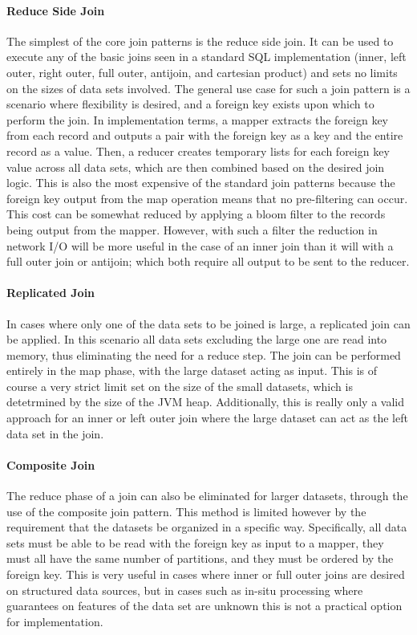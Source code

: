 \paragraph{Reduce Side Join}
The simplest of the core join patterns is the reduce side join. It can be used to execute any of the basic joins seen in a standard SQL implementation (inner, left outer, right outer, full outer, antijoin, and cartesian product) and sets no limits on the sizes of data sets involved. The general use case for such a join pattern is a scenario where flexibility is desired, and a foreign key exists upon which to perform the join. In implementation terms, a mapper extracts the foreign key from each record and outputs a pair with the foreign key as a key and the entire record as a value. Then, a reducer creates temporary lists for each foreign key value across all data sets, which are then combined based on the desired join logic. This is also the most expensive of the standard join patterns because the foreign key output from the map operation means that no pre-filtering can occur. This cost can be somewhat reduced by applying a bloom filter to the records being output from the mapper. However, with such a filter the reduction in network I/O will be more useful in the case of an inner join than it will with a full outer join or antijoin; which both require all output to be sent to the reducer. 

\paragraph{Replicated Join}
In cases where only one of the data sets to be joined is large, a replicated join can be applied. In this scenario all data sets excluding the large one are read into memory, thus eliminating the need for a reduce step. The join can be performed entirely in the map phase, with the large dataset acting as input. This is of course a very strict limit set on the size of the small datasets, which is detetrmined by the size of the JVM heap. Additionally, this is really only a valid approach for an inner or left outer join where the large dataset can act as the left data set in the join. 

\paragraph{Composite Join}
The reduce phase of a join can also be eliminated for larger datasets, through the use of the composite join pattern. This method is limited however by the requirement that the datasets be organized in a specific way. Specifically, all data sets must be able to be read with the foreign key as input to a mapper, they must all have the same number of partitions, and they must be ordered by the foreign key. This is very useful in cases where inner or full outer joins are desired on structured data sources, but in cases such as in-situ processing where guarantees on features of the data set are unknown this is not a practical option for implementation.


